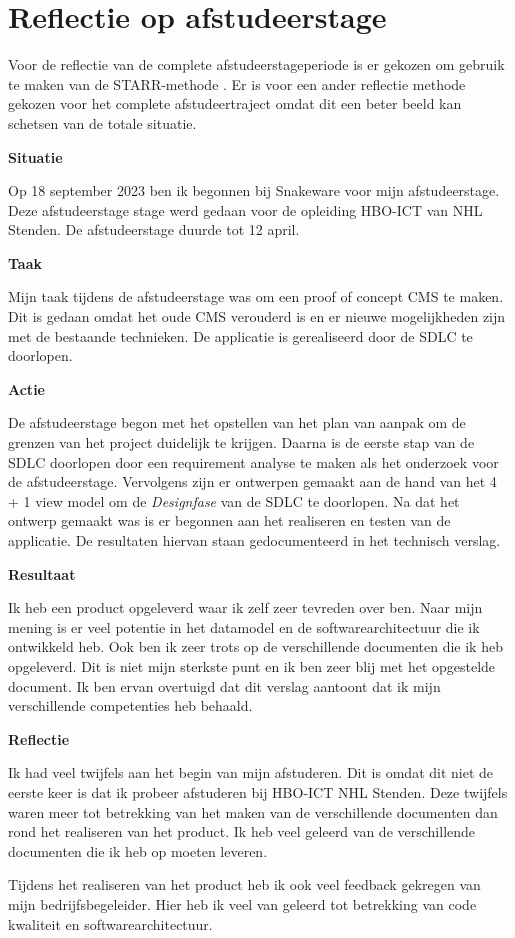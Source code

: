 \section{Reflectie op afstudeerstage}
Voor de reflectie van de complete afstudeerstageperiode is er gekozen om gebruik te maken van de STARR-methode \parencite{STARR}.
Er is voor een ander reflectie methode gekozen voor het complete afstudeertraject omdat dit een beter beeld kan schetsen van de totale situatie.

\whitespace
\textbf{Situatie}

\whitespace
Op 18 september 2023 ben ik begonnen bij Snakeware voor mijn afstudeerstage.
Deze afstudeerstage stage werd gedaan voor de opleiding HBO-ICT van NHL Stenden.
De afstudeerstage duurde tot 12 april.

\whitespace
\textbf{Taak}

\whitespace
Mijn taak tijdens de afstudeerstage was om een proof of concept \gls{CMS} te maken.
Dit is gedaan omdat het oude CMS verouderd is en er nieuwe mogelijkheden zijn met de bestaande technieken.
De applicatie is gerealiseerd door de \gls{SDLC} te doorlopen.

\whitespace
\textbf{Actie}

\whitespace
De afstudeerstage begon met het opstellen van het plan van aanpak om de grenzen van het project duidelijk te krijgen.
Daarna is de eerste stap van de \gls{SDLC} doorlopen door een requirement analyse te maken als het onderzoek voor de afstudeerstage.
Vervolgens zijn er ontwerpen gemaakt aan de hand van het 4 + 1 view model om de \textit{Designfase} van de \gls{SDLC} te doorlopen. 
Na dat het ontwerp gemaakt was is er begonnen aan het realiseren en testen van de applicatie.
De resultaten hiervan staan gedocumenteerd in het technisch verslag.

\whitespace
\textbf{Resultaat}

\whitespace
Ik heb een product opgeleverd waar ik zelf zeer tevreden over ben.
Naar mijn mening is er veel potentie in het datamodel en de softwarearchitectuur die ik ontwikkeld heb.
Ook ben ik zeer trots op de verschillende documenten die ik heb opgeleverd.
Dit is niet mijn sterkste punt en ik ben zeer blij met het opgestelde document.
Ik ben ervan overtuigd dat dit verslag aantoont dat ik mijn verschillende competenties heb behaald.

\whitespace
\textbf{Reflectie}

\whitespace
Ik had veel twijfels aan het begin van mijn afstuderen.
Dit is omdat dit niet de eerste keer is dat ik probeer afstuderen bij HBO-ICT NHL Stenden.
Deze twijfels waren meer tot betrekking van het maken van de verschillende documenten dan rond het realiseren van het product.
Ik heb veel geleerd van de verschillende documenten die ik heb op moeten leveren.

\whitespace
Tijdens het realiseren van het product heb ik ook veel feedback gekregen van mijn bedrijfsbegeleider.
Hier heb ik veel van geleerd tot betrekking van code kwaliteit en softwarearchitectuur.

